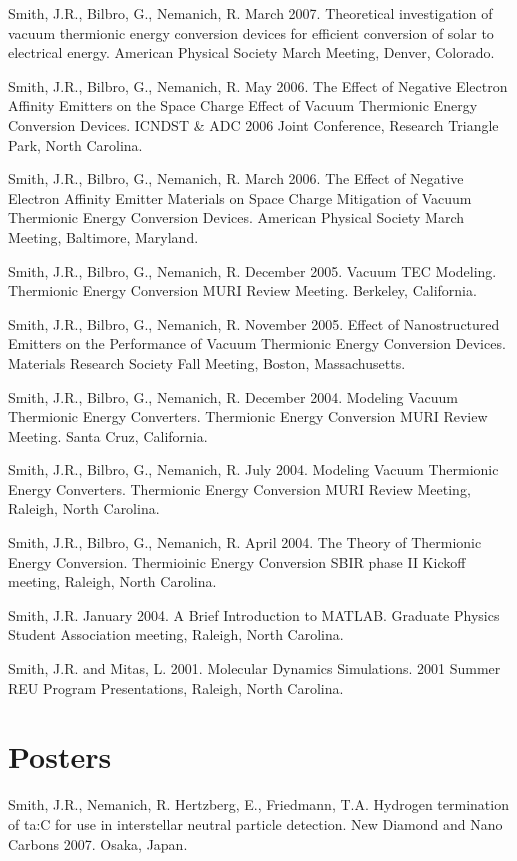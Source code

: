 \documentclass[letterpaper,margin,line]{res}
\begin{document}
\begin{resume}
Smith, J.R., Bilbro, G., Nemanich, R. March 2007. Theoretical investigation of vacuum thermionic energy conversion devices for efficient conversion of solar to electrical energy. American Physical Society March Meeting, Denver, Colorado.

Smith, J.R., Bilbro, G., Nemanich, R. May 2006. The Effect of Negative Electron Affinity Emitters on the Space Charge Effect of Vacuum Thermionic Energy Conversion Devices. ICNDST \& ADC 2006 Joint Conference, Research Triangle Park, North Carolina.

Smith, J.R., Bilbro, G., Nemanich, R. March 2006. The Effect of Negative Electron Affinity Emitter Materials on Space Charge Mitigation of Vacuum Thermionic Energy Conversion Devices. American Physical Society March Meeting, Baltimore, Maryland.

Smith, J.R., Bilbro, G., Nemanich, R. December 2005. Vacuum TEC Modeling. Thermionic Energy Conversion MURI Review Meeting. Berkeley, California.

Smith, J.R., Bilbro, G., Nemanich, R. November 2005. Effect of Nanostructured Emitters on the Performance of Vacuum Thermionic Energy Conversion Devices. Materials Research Society Fall Meeting, Boston, Massachusetts.

Smith, J.R., Bilbro, G., Nemanich, R. December 2004. Modeling Vacuum Thermionic Energy Converters. Thermionic Energy Conversion MURI Review Meeting. Santa Cruz, California.

Smith, J.R., Bilbro, G., Nemanich, R. July 2004. Modeling Vacuum Thermionic Energy Converters. Thermionic Energy Conversion MURI Review Meeting, Raleigh, North Carolina.

Smith, J.R., Bilbro, G., Nemanich, R. April 2004. The Theory of Thermionic Energy Conversion. Thermioinic Energy Conversion SBIR phase II Kickoff meeting, Raleigh, North Carolina.

Smith, J.R. January 2004. A Brief Introduction to MATLAB. Graduate Physics Student Association meeting, Raleigh, North Carolina.

Smith, J.R. and Mitas, L. 2001. Molecular Dynamics Simulations. 2001 Summer REU Program Presentations, Raleigh, North Carolina.


\section{\sc Posters}
Smith, J.R., Nemanich, R. Hertzberg, E., Friedmann, T.A. Hydrogen termination of ta:C for use in interstellar neutral particle detection. New Diamond and Nano Carbons 2007. Osaka, Japan.


\end{resume}
\end{document}
